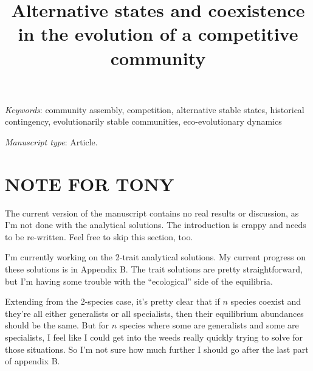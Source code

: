 \documentclass[11pt]{article}
\title{Alternative states and coexistence in the evolution of a competitive community}
\author{}
\date{}
\begin{document}
\maketitle


%

\bigskip


\bigskip


\textit{Keywords}: {
community assembly,
competition,
alternative stable states,
historical contingency,
evolutionarily stable communities,
eco-evolutionary dynamics}


\bigskip

\textit{Manuscript type}: Article.

\bigskip


\linenumbers{}
\modulolinenumbers[3]

\newpage{}


\section*{NOTE FOR TONY}

The current version of the manuscript contains no real results or discussion, as I'm
not done with the analytical solutions.
The introduction is crappy and needs to be re-written.
Feel free to skip this section, too.

I'm currently working on the 2-trait analytical solutions.
My current progress on these solutions is in Appendix B.
The trait solutions are pretty straightforward, but
I'm having some trouble with the ``ecological'' side of the equilibria.

Extending from the 2-species case, it's pretty clear that if $n$ species coexist and
they're all either generalists or all specialists, then their equilibrium abundances
should be the same.
But for $n$ species where some are generalists and some are specialists, I feel like
I could get into the weeds really quickly trying to solve for those situations.
So I'm not sure how much further I should go after the last part of appendix B.
\end{document}
